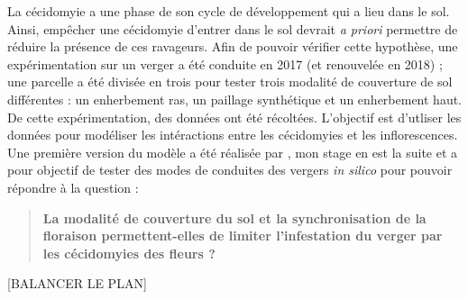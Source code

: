 La cécidomyie a une phase de son cycle de développement qui a lieu dans le sol.
Ainsi, empêcher une cécidomyie d'entrer dans le sol devrait \emph{a priori} permettre de réduire la présence de ces ravageurs.
Afin de pouvoir vérifier cette hypothèse, une expérimentation sur un verger a été conduite en 2017 (et renouvelée en 2018) ; une parcelle a été divisée en trois pour tester trois modalité de couverture de sol différentes : un enherbement ras, un paillage synthétique et un enherbement haut. De cette expérimentation, des données ont été récoltées. L'objectif est d'utliser les données pour modéliser les intéractions  entre les cécidomyies et les inflorescences.
Une première version du modèle a été réalisée par \citet{laurie}, mon stage en est la suite et a pour objectif de tester des modes de conduites des vergers \emph{in silico} pour pouvoir répondre à la question :
\begin{quote}
 \textbf{La modalité de couverture du sol et la synchronisation de la floraison permettent-elles de limiter l'infestation du verger par les cécidomyies des fleurs ?}
\end{quote}

[BALANCER LE PLAN]
